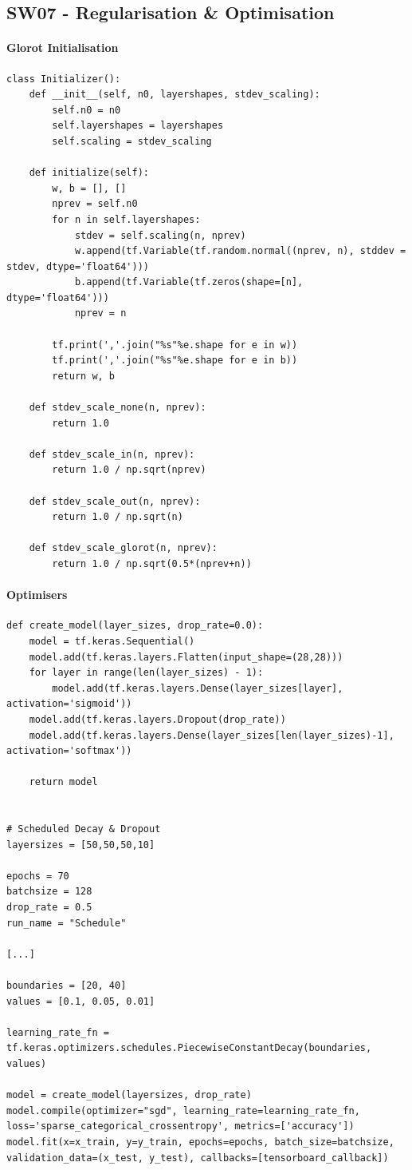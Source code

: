 \documentclass[11pt]{article}
\begin{document}
\subsection{SW07 - Regularisation \& Optimisation}
\paragraph{Glorot Initialisation}
\begin{verbatim}
class Initializer():
	def __init__(self, n0, layershapes, stdev_scaling):
		self.n0 = n0
		self.layershapes = layershapes
		self.scaling = stdev_scaling
	
	def initialize(self):
		w, b = [], []
		nprev = self.n0
		for n in self.layershapes:
			stdev = self.scaling(n, nprev)
			w.append(tf.Variable(tf.random.normal((nprev, n), stddev = stdev, dtype='float64')))
			b.append(tf.Variable(tf.zeros(shape=[n], dtype='float64')))
			nprev = n
		
		tf.print(','.join("%s"%e.shape for e in w))
		tf.print(','.join("%s"%e.shape for e in b))
		return w, b

	def stdev_scale_none(n, nprev):
		return 1.0

	def stdev_scale_in(n, nprev):
		return 1.0 / np.sqrt(nprev)

	def stdev_scale_out(n, nprev):
		return 1.0 / np.sqrt(n)

	def stdev_scale_glorot(n, nprev):
		return 1.0 / np.sqrt(0.5*(nprev+n))
\end{verbatim}

\paragraph{Optimisers}
\begin{verbatim}
def create_model(layer_sizes, drop_rate=0.0):
	model = tf.keras.Sequential()
	model.add(tf.keras.layers.Flatten(input_shape=(28,28)))
	for layer in range(len(layer_sizes) - 1):
		model.add(tf.keras.layers.Dense(layer_sizes[layer], activation='sigmoid'))
	model.add(tf.keras.layers.Dropout(drop_rate))
	model.add(tf.keras.layers.Dense(layer_sizes[len(layer_sizes)-1], activation='softmax'))
	
	return model


# Scheduled Decay & Dropout
layersizes = [50,50,50,10]

epochs = 70
batchsize = 128 
drop_rate = 0.5
run_name = "Schedule"

[...]

boundaries = [20, 40]
values = [0.1, 0.05, 0.01]

learning_rate_fn = tf.keras.optimizers.schedules.PiecewiseConstantDecay(boundaries, values)

model = create_model(layersizes, drop_rate)
model.compile(optimizer="sgd", learning_rate=learning_rate_fn, loss='sparse_categorical_crossentropy', metrics=['accuracy'])
model.fit(x=x_train, y=y_train, epochs=epochs, batch_size=batchsize, validation_data=(x_test, y_test), callbacks=[tensorboard_callback])
\end{verbatim}
\end{document}

